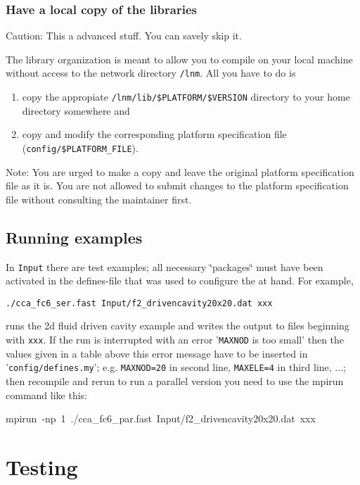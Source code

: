 \subsubsection{Have a local copy of the \ccarat{} libraries}

Caution: This a advanced stuff. You can savely skip it.

The \ccarat{} library organization is meant to allow you to compile
\ccarat{} on your local machine without access to the network directory
\texttt{/lnm}. All you have to do is

\begin{enumerate}
\item copy the appropiate \texttt{/lnm/lib/\$PLATFORM/\$VERSION} directory
to your home directory somewhere and
\item copy and modify the corresponding platform specification file (\texttt{config/\$PLATFORM\_FILE}).
\end{enumerate}
Note: You are urged to make a copy and leave the original platform
specification file as it is. You are not allowed to submit changes
to the platform specification file without consulting the \ccarat{}
maintainer first.


\subsection{Running examples}

In \texttt{Input} there are test examples; all necessary \char`\"{}packages\char`\"{}
must have been activated in the defines-file that was used to configure
the \ccarat{} at hand. For example, 

\texttt{./cca\_fc6\_ser.fast Input/f2\_drivencavity20x20.dat xxx }

runs the 2d fluid driven cavity example and writes the output to files
beginning with \texttt{xxx}. If the run is interrupted with an error
'\texttt{MAXNOD} is too small' then the values given in a table above
this error message have to be inserted in '\texttt{config/defines.my}';
e.g. \texttt{MAXNOD=20} in second line, \texttt{MAXELE=4} in third
line, ...; then recompile and rerun to run a parallel version you
need to use the mpirun command like this: 

\begin{lyxcode}
mpirun~-np~1~./cca\_fc6\_par.fast~Input/f2\_drivencavity20x20.dat~xxx
\end{lyxcode}

\section{Testing}

